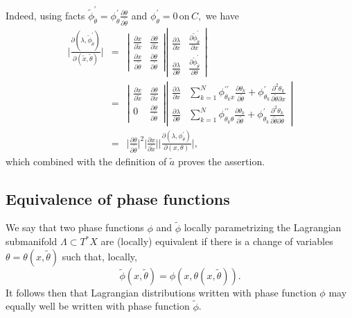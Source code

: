 \documentclass[10pt, a4paper, twoside]{amsart}
\numberwithin{equation}{section}
\theoremstyle{remark}
\begin{document}
\begin{appendix}
	Indeed, using facts $\tilde{\phi}^\prime_{\tilde{\theta}} = \phi^\prime_\theta \frac{\partial \theta}{\partial \tilde{\theta}} $ and $ \phi^\prime_\theta = 0 \,\mbox{on}\, C,$ we have \begin{eqnarray*}\bigg|\frac{\partial ({\lambda}, \tilde{\phi}^\prime_{\tilde{\theta}})}{\partial (\tilde{x}, \tilde{\theta})}\bigg| & = &\left|\begin{array}{cc}\frac{\partial x}{\partial \tilde{x}}&\frac{\partial \theta}{\partial \tilde{x}}\\\frac{\partial x}{\partial \tilde{\theta}}&\frac{\partial \theta}{\partial \tilde{\theta}}\end{array}\right| \left|\begin{array}{cc}\frac{\partial \lambda}{\partial x}&\frac{\partial \tilde{\phi}^\prime_{\tilde{\theta}}}{\partial x}\\\frac{\partial \lambda}{\partial \theta}&\frac{\partial \tilde{\phi}^\prime_{\tilde{\theta}}}{\partial \theta}\end{array}\right|\\& = &\left|\begin{array}{cc}\frac{\partial x}{\partial \tilde{x}}&\frac{\partial \theta}{\partial \tilde{x}}\\0&\frac{\partial \theta}{\partial \tilde{\theta}}\end{array}\right| \left|\begin{array}{cc}\frac{\partial \lambda}{\partial x}&\sum_{k = 1}^N \phi^{\prime\prime}_{\theta_kx}\frac{\partial \theta_k}{\partial \tilde{\theta}} + \phi^\prime_{\theta_k}\frac{\partial^2 \theta_k}{\partial \tilde{\theta} \partial x}\\\frac{\partial \lambda}{\partial \theta}&\sum_{k = 1}^N \phi^{\prime\prime}_{\theta_k\theta}\frac{\partial \theta_k}{\partial \tilde{\theta}} + \phi^\prime_{\theta_k}\frac{\partial^2 \theta_k}{\partial \tilde{\theta} \partial \theta}\end{array}\right|\\ & = & \bigg|\frac{\partial\theta}{\partial\tilde{\theta}}\bigg|^2 \bigg|\frac{\partial x}{\partial \tilde{x}}\bigg| \bigg|\frac{\partial (\lambda, \phi^\prime_\theta)}{\partial (x, \theta)}\bigg|,\end{eqnarray*} which  combined with the definition of $\tilde{a}$ proves the assertion.
	
	
	\subsection{Equivalence of phase functions}
	We say that two phase functions $\phi$ and $\tilde \phi$ locally parametrizing the Lagrangian submanifold $\Lambda \subset T^* X$ are (locally) equivalent if there is a change of variables  $\theta = \theta(x, \tilde \theta)$ such that, locally, 
	$$
	\tilde\phi(x, \tilde \theta) = \phi(x, \theta(x, \tilde \theta)).
	$$
	It follows then that Lagrangian distributions written with phase function $\phi$ may equally well be written with phase function $\tilde \phi$. 
	

\end{appendix}
\end{document}

